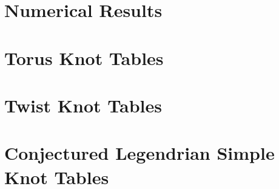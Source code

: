 \documentclass{dcthesis}
\theoremstyle{plain}
\theoremstyle{normal}
\begin{document}
    \chapter{Numerical Results}
        
        
        
        
        
    \appendix
    \chapter{Torus Knot Tables}
        
    \chapter{Twist Knot Tables}
        
    \chapter{Conjectured Legendrian Simple Knot Tables}
        
    \backmatter
    
    
    \printindex
\end{document}
